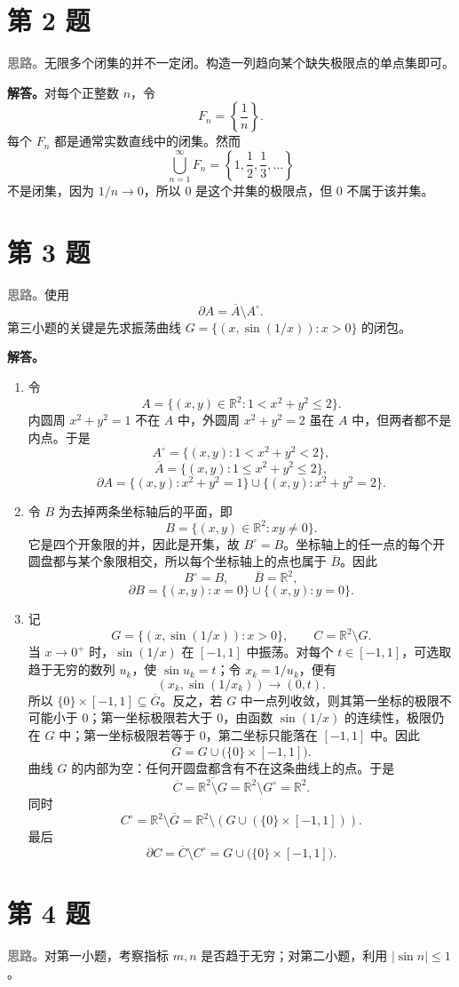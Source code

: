 \documentclass[UTF8,a4paper,11pt,fontset=windows]{ctexart}
\newcommand{\problem}[1]{\section*{第 #1 题}}
\newcommand{\idea}{\par\noindent\textcolor{gray}{\textbf{思路。}}}
\newcommand{\solution}{\par\noindent\textbf{解答。}}
\newcommand{\R}{\mathbb R}
\begin{document}
\problem{2}
\idea 无限多个闭集的并不一定闭。构造一列趋向某个缺失极限点的单点集即可。

\solution 对每个正整数 $n$，令
\[
  F_n=\left\{\frac1n\right\}.
\]
每个 $F_n$ 都是通常实数直线中的闭集。然而
\[
  \bigcup_{n=1}^{\infty}F_n=\left\{1,\frac12,\frac13,\ldots\right\}
\]
不是闭集，因为 $1/n\to0$，所以 $0$ 是这个并集的极限点，但 $0$ 不属于该并集。

\problem{3}
\idea 使用
\[
  \partial A=\overline A\setminus A^\circ.
\]
第三小题的关键是先求振荡曲线 $G=\{(x,\sin(1/x)):x>0\}$ 的闭包。

\solution
\begin{enumerate}
  \item 令
  \[
    A=\{(x,y)\in\R^2:1<x^2+y^2\leq2\}.
  \]
  内圆周 $x^2+y^2=1$ 不在 $A$ 中，外圆周 $x^2+y^2=2$ 虽在 $A$ 中，但两者都不是内点。于是
  \[
    A^\circ=\{(x,y):1<x^2+y^2<2\},
  \]
  \[
    \overline A=\{(x,y):1\leq x^2+y^2\leq2\},
  \]
  \[
    \partial A=\{(x,y):x^2+y^2=1\}\cup
    \{(x,y):x^2+y^2=2\}.
  \]

  \item 令 $B$ 为去掉两条坐标轴后的平面，即
  \[
    B=\{(x,y)\in\R^2:xy\neq0\}.
  \]
  它是四个开象限的并，因此是开集，故 $B^\circ=B$。坐标轴上的任一点的每个开圆盘都与某个象限相交，所以每个坐标轴上的点也属于 $\overline B$。因此
  \[
    B^\circ=B,\qquad \overline B=\R^2,
  \]
  \[
    \partial B=\{(x,y):x=0\}\cup\{(x,y):y=0\}.
  \]

  \item 记
  \[
    G=\{(x,\sin(1/x)):x>0\},\qquad C=\R^2\setminus G.
  \]
  当 $x\to0^+$ 时，$\sin(1/x)$ 在 $[-1,1]$ 中振荡。对每个 $t\in[-1,1]$，可选取趋于无穷的数列 $u_k$，使 $\sin u_k=t$；令 $x_k=1/u_k$，便有
  \[
    (x_k,\sin(1/x_k))\longrightarrow(0,t).
  \]
  所以 $\{0\}\times[-1,1]\subseteq\overline G$。反之，若 $G$ 中一点列收敛，则其第一坐标的极限不可能小于 $0$；第一坐标极限若大于 $0$，由函数 $\sin(1/x)$ 的连续性，极限仍在 $G$ 中；第一坐标极限若等于 $0$，第二坐标只能落在 $[-1,1]$ 中。因此
  \[
    \overline G=G\cup\bigl(\{0\}\times[-1,1]\bigr).
  \]
  曲线 $G$ 的内部为空：任何开圆盘都含有不在这条曲线上的点。于是
  \[
    \overline C=\overline{\R^2\setminus G}
    =\R^2\setminus G^\circ=\R^2.
  \]
  同时
  \[
    C^\circ=\R^2\setminus\overline G
    =\R^2\setminus\left(G\cup(\{0\}\times[-1,1])\right).
  \]
  最后
  \[
    \partial C=\overline C\setminus C^\circ
    =G\cup\bigl(\{0\}\times[-1,1]\bigr).
  \]
\end{enumerate}

\problem{4}
\idea 对第一小题，考察指标 $m,n$ 是否趋于无穷；对第二小题，利用 $|\sin n|\leq1$。
\end{document}
